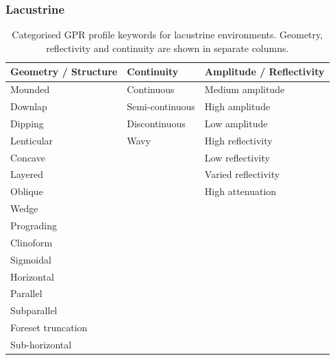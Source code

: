 \clearpage
\subsubsection{Lacustrine}
\begin{table}[h!]
\centering
\caption{Categorised GPR profile keywords for lacustrine environments. Geometry, reflectivity and continuity are shown in separate columns.}
\begin{tabular}{|p{4.5cm}|p{4.5cm}|p{4.5cm}|}
\hline
\textbf{Geometry / Structure} & \textbf{Continuity} & \textbf{Amplitude / Reflectivity} \\
\hline
Mounded & Continuous & Medium amplitude \\
Downlap & Semi-continuous & High amplitude \\
Dipping & Discontinuous & Low amplitude \\
Lenticular & Wavy & High reflectivity \\
Concave & & Low reflectivity \\
Layered & & Varied reflectivity \\
Oblique & & High attenuation \\
Wedge & & \\
Prograding & & \\
Clinoform & & \\
Sigmoidal & & \\
Horizontal & & \\
Parallel & & \\
Subparallel & & \\
Foreset truncation & & \\
Sub-horizontal & & \\
\hline
\end{tabular}
\label{tab:lacustrine-keywords}
\end{table}

